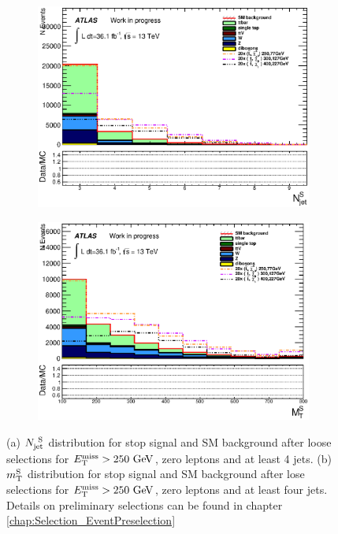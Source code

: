 \begin{figure}[h]
  \begin{center}
    \begin{subfigure}[b]{0.40\textwidth}
        \includegraphics[width=\textwidth]{figures/plotSR/SR_ND1_NjV_0SR.eps}%
        \caption{ }
    \end{subfigure}
    \begin{subfigure}[b]{0.40\textwidth}
        \includegraphics[width=\textwidth]{figures/plotSR/SR_ND1_MS_0SR.eps}%
                \caption{ }
    \end{subfigure}
\caption[$\NjV$ and $\MS$ distributions for stop signal and SM background after lose selections for $\met>250 \gev$, zero leptons and at least four jets]{ (a) $\NjV$ distribution for stop signal and SM background after loose selections for $\met>250 \gev$, zero leptons and at least 4 jets.  (b) $\MS$ distribution for stop signal and SM background after lose selections for $\met>250 \gev$, zero leptons and at least four jets. Details on preliminary selections can be found in chapter \ref{chap:Selection_EventPreselection} }
\end{center}
\label{fig:gluino_meff} 
\end{figure}

